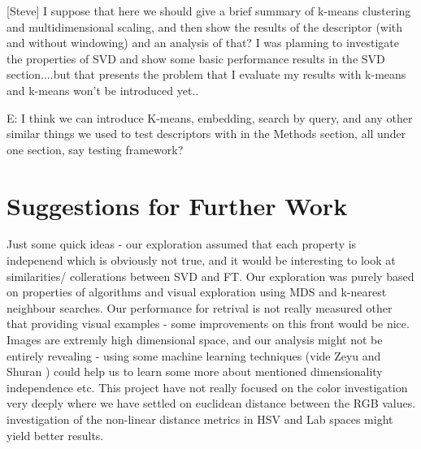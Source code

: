 \documentclass{report}
\begin{document}
[Steve] I suppose that here we should give a brief summary of k-means clustering and multidimensional scaling, and then show the results of the descriptor (with and without windowing) and an analysis of that? I was planning to investigate the properties of SVD and show some basic performance results in the SVD section....but that presents the problem that I evaluate my results with k-means and k-means won't be introduced yet..

E: I think we can introduce K-means, embedding, search by query, and any other similar things we used to test descriptors with in the Methods section, all under one section, say testing framework?


\chapter{Suggestions for Further Work}
Just some quick ideas - our exploration assumed that each property is indepenend which is obviously not true, and it would be interesting to look at similarities/ collerations between SVD and FT. 
Our exploration was purely based on properties of algorithms and visual exploration using MDS and k-nearest neighbour searches. Our performance for retrival is not really measured other that providing visual examples - some improvements on this front would be nice.
Images are extremly high dimensional space, and our analysis might not be entirely revealing - using some machine learning techniques (vide Zeyu and Shuran ) could help us to learn some more about mentioned dimensionality independence etc.
This project have not really focused on the color investigation very deeply where we have settled on euclidean distance between the RGB values. investigation of the non-linear distance metrics in HSV and Lab spaces might yield better results.
\end{document}

